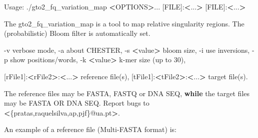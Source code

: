 \documentclass[11pt,]{krantz}
\newenvironment{Shaded}{\begin{snugshade}}{\end{snugshade}}
\newcommand{\KeywordTok}[1]{\textcolor[rgb]{0.27,0.27,0.27}{\textbf{#1}}}
\newcommand{\DataTypeTok}[1]{\textcolor[rgb]{0.27,0.27,0.27}{#1}}
\newcommand{\OperatorTok}[1]{\textcolor[rgb]{0.43,0.43,0.43}{\textbf{#1}}}
\newcommand{\BuiltInTok}[1]{#1}
\newcommand{\ExtensionTok}[1]{#1}
\newcommand{\NormalTok}[1]{#1}
\begin{document}
\begin{Shaded}
\begin{Highlighting}[]
\ExtensionTok{Usage}\NormalTok{: ./gto2_fq_variation_map }\OperatorTok{<}\NormalTok{OPTIONS}\OperatorTok{>}\NormalTok{... [FILE]:}\OperatorTok{<}\NormalTok{...}\OperatorTok{>} 
\NormalTok{[}\ExtensionTok{FILE}\NormalTok{]:}\OperatorTok{<}\NormalTok{...}\OperatorTok{>}

\ExtensionTok{The}\NormalTok{ gto2_fq_variation_map is a tool to map relative }
\ExtensionTok{singularity}\NormalTok{ regions. The (probabilistic) }\ExtensionTok{Bloom}\NormalTok{ filter is }
\ExtensionTok{automatically}\NormalTok{ set.   }
                                                         
  \ExtensionTok{-v}\NormalTok{                       verbose mode,                 }
  \ExtensionTok{-a}\NormalTok{                       about CHESTER,                }
  \ExtensionTok{-s} \OperatorTok{<}\NormalTok{value}\OperatorTok{>}\NormalTok{               bloom size,                   }
  \ExtensionTok{-i}\NormalTok{                       use inversions,               }
  \ExtensionTok{-p}\NormalTok{                       show positions/words,         }
  \ExtensionTok{-k} \OperatorTok{<}\NormalTok{value}\OperatorTok{>}\NormalTok{               k-mer size (up to 30),        }
                                                         
\NormalTok{  [}\ExtensionTok{rFile1}\NormalTok{]:}\OperatorTok{<}\NormalTok{rFile2}\OperatorTok{>}\NormalTok{:}\OperatorTok{<}\NormalTok{...}\OperatorTok{>}\NormalTok{  reference file(s),            }
\NormalTok{  [}\ExtensionTok{tFile1}\NormalTok{]:}\OperatorTok{<}\NormalTok{tFile2}\OperatorTok{>}\NormalTok{:}\OperatorTok{<}\NormalTok{...}\OperatorTok{>}\NormalTok{  target file(s)}\BuiltInTok{.}               
                                                         
\ExtensionTok{The}\NormalTok{ reference files may be FASTA, FASTQ or DNA SEQ,      }
\KeywordTok{while} \ExtensionTok{the}\NormalTok{ target files may be FASTA OR DNA SEQ.          }
\ExtensionTok{Report}\NormalTok{ bugs to }\OperatorTok{<}\DataTypeTok{\{pratas,raquelsilva,ap,pjf\}}\NormalTok{@ua.pt}\OperatorTok{>}\NormalTok{.}
\end{Highlighting}
\end{Shaded}

An example of a reference file (Multi-FASTA format) is:
\end{document}
